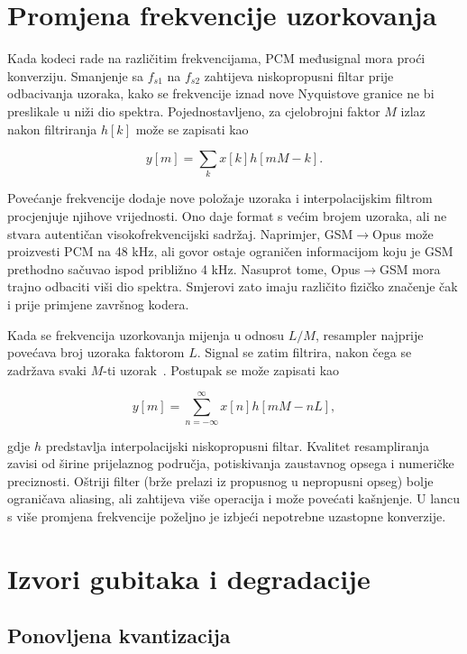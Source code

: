 \section{Promjena frekvencije uzorkovanja}

Kada kodeci rade na različitim frekvencijama, PCM međusignal mora proći konverziju. Smanjenje sa $f_{s1}$ na $f_{s2}$ zahtijeva niskopropusni filtar prije odbacivanja uzoraka, kako se frekvencije iznad nove Nyquistove granice ne bi preslikale u niži dio spektra. Pojednostavljeno, za cjelobrojni faktor $M$ izlaz nakon filtriranja $h[k]$ može se zapisati kao

\begin{equation}
y[m]=\sum_k x[k]h[mM-k].
\end{equation}

Povećanje frekvencije dodaje nove položaje uzoraka i interpolacijskim filtrom procjenjuje njihove vrijednosti. Ono daje format s većim brojem uzoraka, ali ne stvara autentičan visokofrekvencijski sadržaj. Naprimjer, GSM$\rightarrow$Opus može proizvesti PCM na 48 kHz, ali govor ostaje ograničen informacijom koju je GSM prethodno sačuvao ispod približno 4 kHz. Nasuprot tome, Opus$\rightarrow$GSM mora trajno odbaciti viši dio spektra. Smjerovi zato imaju različito fizičko značenje čak i prije primjene završnog kodera.

Kada se frekvencija uzorkovanja mijenja u odnosu $L/M$, resampler najprije povećava broj uzoraka faktorom $L$. Signal se zatim filtrira, nakon čega se zadržava svaki $M$-ti uzorak~\cite{oppenheim-schafer}. Postupak se može zapisati kao

\begin{equation}
y[m]=\sum_{n=-\infty}^{\infty}x[n]h[mM-nL],
\end{equation}

gdje $h$ predstavlja interpolacijski niskopropusni filtar. Kvalitet resampliranja zavisi od širine prijelaznog područja, potiskivanja zaustavnog opsega i numeričke preciznosti. Oštriji filter (brže prelazi iz propusnog u nepropusni opseg) bolje ograničava aliasing, ali zahtijeva više operacija i može povećati kašnjenje. U lancu s više promjena frekvencije poželjno je izbjeći nepotrebne uzastopne konverzije.

\section{Izvori gubitaka i degradacije}

\subsection{Ponovljena kvantizacija}

